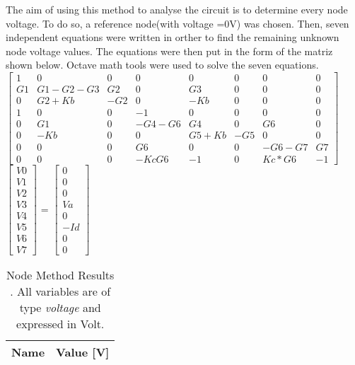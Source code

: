 The aim of using this method to analyse the circuit is to determine every node voltage. To do so, a reference node(with voltage =0V) was chosen. Then, seven independent equations were written in orther to find the remaining unknown node voltage values. The equations were then put in the form of the matriz shown below. Octave math tools were used to solve the seven equations.\\


$\begin{bmatrix}
1 & 0 & 0 & 0 & 0 & 0 & 0 & 0\\
G1 & G1-G2-G3 & G2 & 0 & G3 & 0 & 0 & 0\\
0 & G2+Kb & -G2 & 0 & -Kb & 0 & 0 & 0\\
1 & 0 & 0 & -1 & 0 & 0 & 0 & 0\\
0 & G1 & 0 & -G4-G6 & G4 & 0 & G6 & 0\\
0 & -Kb & 0 & 0 & G5+Kb & -G5 & 0 & 0\\
0 & 0 & 0 & G6 & 0 & 0 & -G6-G7 & G7\\
0 & 0 & 0 & -KcG6 & -1 & 0 & Kc*G6 & -1
\end{bmatrix}$
$\begin{bmatrix}
V0 \\ V1 \\ V2 \\ V3 \\ V4 \\ V5 \\ V6 \\ V7
\end{bmatrix}$
= 
$\begin{bmatrix}
0 \\ 0 \\ 0 \\ Va \\ 0 \\ -Id \\ 0 \\ 0
\end{bmatrix}$

\begin{table}[ht]
  \centering
  \begin{tabular}{|l|r|}
    \hline    
    {\bf Name} & {\bf Value [V]} \\ \hline
    
  \end{tabular}
  \caption{Node Method Results . All variables are of type {\it voltage} and expressed in
    Volt.}
  \label{tab:nos}
\end{table}


